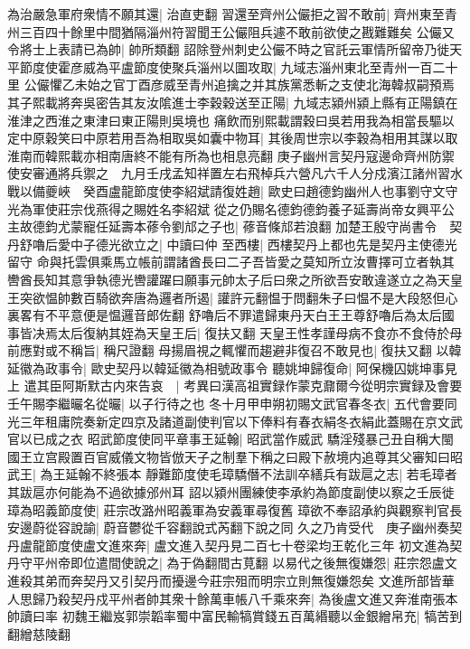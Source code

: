 為治嚴急軍府衆情不願其還|{
	治直吏翻}
習還至齊州公儼拒之習不敢前|{
	齊州東至青州三百四十餘里中間猶隔淄州符習聞王公儼阻兵遽不敢前欲使之戡難難矣}
公儼又令將士上表請已為帥|{
	帥所類翻}
詔除登州刺史公儼不時之官託云軍情所留帝乃徙天平節度使霍彦威為平盧節度使聚兵淄州以圖攻取|{
	九域志淄州東北至青州一百二十里}
公儼懼乙未始之官丁酉彦威至青州追擒之并其族黨悉斬之支使北海韓叔嗣預焉其子熙載將奔吳密告其友汝隂進士李穀穀送至正陽|{
	九域志潁州潁上縣有正陽鎮在淮津之西淮之東津曰東正陽則吳境也}
痛飲而别熙載謂穀曰吳若用我為相當長驅以定中原穀笑曰中原若用吾為相取吳如囊中物耳|{
	其後周世宗以李穀為相用其謀以取淮南而韓熙載亦相南唐終不能有所為也相息亮翻}
庚子幽州言契丹寇邊命齊州防禦使安審通將兵禦之　九月壬戌孟知祥置左右飛棹兵六營凡六千人分戍濱江諸州習水戰以備夔峽　癸酉盧龍節度使李紹斌請復姓趙|{
	歐史曰趙德鈞幽州人也事劉守文守光為軍使莊宗伐燕得之賜姓名李紹斌}
從之仍賜名德鈞德鈞養子延壽尚帝女興平公主故德鈞尤蒙寵任延壽本蓚令劉邟之子也|{
	蓚音條邟若浪翻}
加楚王殷守尚書令　契丹舒嚕后愛中子德光欲立之|{
	中讀曰仲}
至西樓|{
	西樓契丹上都也先是契丹主使德光留守}
命與托雲俱乘馬立帳前謂諸酋長曰二子吾皆愛之莫知所立汝曹擇可立者執其轡酋長知其意爭執德光轡讙躍曰願事元帥太子后曰衆之所欲吾安敢違遂立之為天皇王突欲愠帥數百騎欲奔唐為邏者所遏|{
	讙許元翻愠于問翻朱子曰愠不是大段怒但心裏畧有不平意便是愠邏音郎佐翻}
舒嚕后不罪遣歸東丹天白王王尊舒嚕后為太后國事皆决焉太后復納其姪為天皇王后|{
	復扶又翻}
天皇王性孝謹母病不食亦不食侍於母前應對或不稱旨|{
	稱尺證翻}
母揚眉視之輒懼而趨避非復召不敢見也|{
	復扶又翻}
以韓延徽為政事令|{
	歐史契丹以韓延徽為相號政事令}
聽姚坤歸復命|{
	阿保機囚姚坤事見上}
遣其臣阿斯默古内來告哀　|{
	考異曰漢高祖實録作蒙克鼐爾今從明宗實録及會要}
壬午賜李繼曮名從曮|{
	以子行待之也}
冬十月甲申朔初賜文武官春冬衣|{
	五代會要同光三年租庸院奏新定四京及諸道副使判官以下俸料有春衣絹冬衣絹此蓋賜在京文武官以已成之衣}
昭武節度使同平章事王延翰|{
	昭武當作威武}
驕淫殘暴己丑自稱大閩國王立宫殿置百官威儀文物皆倣天子之制羣下稱之曰殿下赦境内追尊其父審知曰昭武王|{
	為王延翰不終張本}
靜難節度使毛璋驕僭不法訓卒繕兵有跋扈之志|{
	若毛璋者其跋扈亦何能為不過欲據邠州耳}
詔以潁州團練使李承約為節度副使以察之壬辰徙璋為昭義節度使|{
	莊宗改潞州昭義軍為安義軍尋復舊}
璋欲不奉詔承約與觀察判官長安邊蔚從容說諭|{
	蔚音鬱從千容翻說式芮翻下說之同}
久之乃肯受代　庚子幽州奏契丹盧龍節度使盧文進來奔|{
	盧文進入契丹見二百七十卷梁均王乾化三年}
初文進為契丹守平州帝即位遣間使說之|{
	為于偽翻間古莧翻}
以易代之後無復嫌怨|{
	莊宗怨盧文進殺其弟而奔契丹又引契丹而擾邊今莊宗殂而明宗立則無復嫌怨矣}
文進所部皆華人思歸乃殺契丹戍平州者帥其衆十餘萬車帳八千乘來奔|{
	為後盧文進又奔淮南張本帥讀曰率}
初魏王繼岌郭崇韜率蜀中富民輸犒賞錢五百萬緡聽以金銀繒帛充|{
	犒苦到翻繒慈陵翻}
